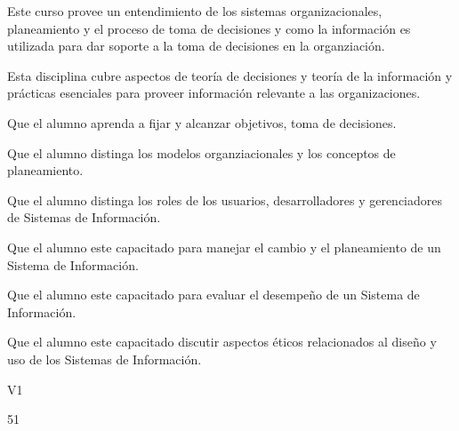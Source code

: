 \begin{syllabus}


\begin{justification}
Este curso provee un entendimiento de los sistemas organizacionales, planeamiento y el proceso de toma de decisiones y como la información es utilizada para dar soporte a la toma de decisiones en la organziación.

Esta disciplina cubre aspectos de teoría de decisiones y teoría de la información y prácticas esenciales para proveer información relevante a las organizaciones.
\end{justification}

\begin{goals}
\item Que el alumno aprenda a fijar y alcanzar objetivos, toma de decisiones.
\item Que el alumno distinga los modelos organziacionales y los conceptos de planeamiento.
\item Que el alumno distinga los roles de los usuarios, desarrolladores y gerenciadores de Sistemas de Información.
\item Que el alumno este capacitado para manejar el cambio y el planeamiento de un Sistema de Información.
\item Que el alumno este capacitado para evaluar el desempeño de un Sistema de Información.
\item Que el alumno este capacitado discutir aspectos éticos relacionados al diseño y uso de los Sistemas de Información.
\end{goals}

\begin{outcomes}{V1}
\end{outcomes}

\begin{unit}{\LUONESIXDef}{}{\LUONESIXBib}{5}{1}
   \begin{topics}
      \item \OMCNINETopicTWOxNINExSEVEN
      \item \TDSONETopicTHREExONExSIX
   \end{topics}
	\LUONESIXGoal
\end{unit}


\end{syllabus}
